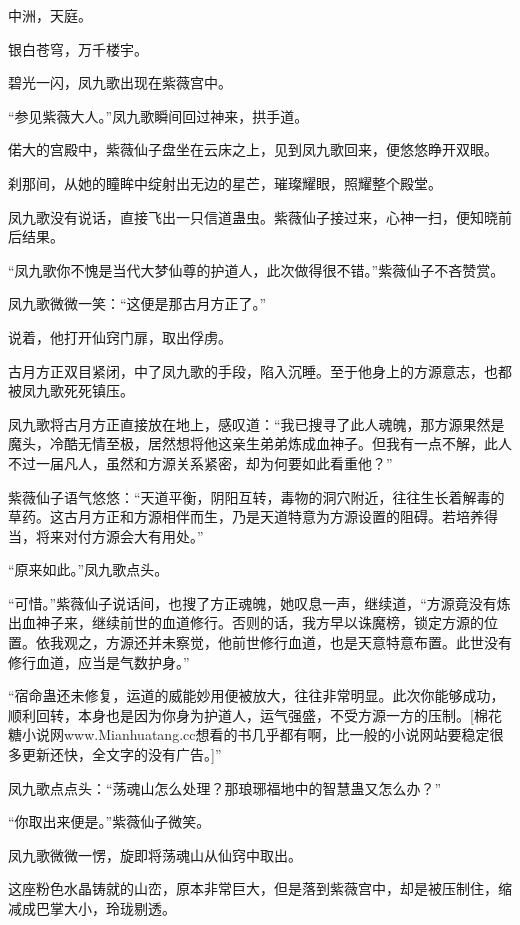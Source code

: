 
\begin{this_body}

中洲，天庭。

银白苍穹，万千楼宇。

碧光一闪，凤九歌出现在紫薇宫中。

“参见紫薇大人。”凤九歌瞬间回过神来，拱手道。

偌大的宫殿中，紫薇仙子盘坐在云床之上，见到凤九歌回来，便悠悠睁开双眼。

刹那间，从她的瞳眸中绽射出无边的星芒，璀璨耀眼，照耀整个殿堂。

凤九歌没有说话，直接飞出一只信道蛊虫。紫薇仙子接过来，心神一扫，便知晓前后结果。

“凤九歌你不愧是当代大梦仙尊的护道人，此次做得很不错。”紫薇仙子不吝赞赏。

凤九歌微微一笑：“这便是那古月方正了。”

说着，他打开仙窍门扉，取出俘虏。

古月方正双目紧闭，中了凤九歌的手段，陷入沉睡。至于他身上的方源意志，也都被凤九歌死死镇压。

凤九歌将古月方正直接放在地上，感叹道：“我已搜寻了此人魂魄，那方源果然是魔头，冷酷无情至极，居然想将他这亲生弟弟炼成血神子。但我有一点不解，此人不过一届凡人，虽然和方源关系紧密，却为何要如此看重他？”

紫薇仙子语气悠悠：“天道平衡，阴阳互转，毒物的洞穴附近，往往生长着解毒的草药。这古月方正和方源相伴而生，乃是天道特意为方源设置的阻碍。若培养得当，将来对付方源会大有用处。”

“原来如此。”凤九歌点头。

“可惜。”紫薇仙子说话间，也搜了方正魂魄，她叹息一声，继续道，“方源竟没有炼出血神子来，继续前世的血道修行。否则的话，我方早以诛魔榜，锁定方源的位置。依我观之，方源还并未察觉，他前世修行血道，也是天意特意布置。此世没有修行血道，应当是气数护身。”

“宿命蛊还未修复，运道的威能妙用便被放大，往往非常明显。此次你能够成功，顺利回转，本身也是因为你身为护道人，运气强盛，不受方源一方的压制。[棉花糖小说网www.Mianhuatang.cc想看的书几乎都有啊，比一般的小说网站要稳定很多更新还快，全文字的没有广告。]”

凤九歌点点头：“荡魂山怎么处理？那琅琊福地中的智慧蛊又怎么办？”

“你取出来便是。”紫薇仙子微笑。

凤九歌微微一愣，旋即将荡魂山从仙窍中取出。

这座粉色水晶铸就的山峦，原本非常巨大，但是落到紫薇宫中，却是被压制住，缩减成巴掌大小，玲珑剔透。


\end{this_body}

